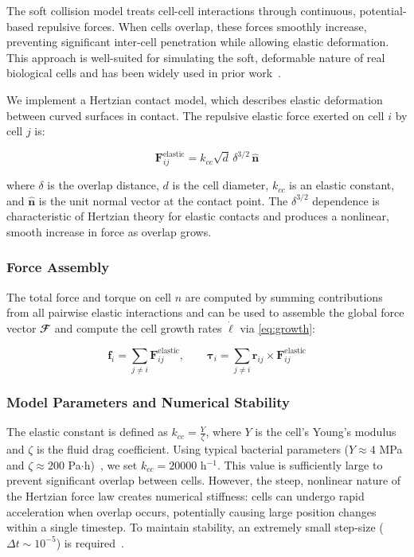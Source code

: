 \documentclass[a4paper,fleqn]{cas-dc}
\begin{document}
The soft collision model treats cell-cell interactions through continuous, potential-based repulsive forces. When cells overlap, these forces smoothly increase, preventing significant inter-cell penetration while allowing elastic deformation. This approach is well-suited for simulating the soft, deformable nature of real biological cells and has been widely used in prior work~\cite{Warren2019, You2018,Blanchard2015,Ghosh2015,Khan_2024,You_2021,Valdez2025,Rudge2013,Langeslay_2023}.

We implement a Hertzian contact model, which describes elastic deformation between curved surfaces in contact. The repulsive elastic force exerted on cell $i$ by cell $j$ is:

\begin{equation} \label{eq:hertzian_contact_model}
    \mathbf{F}^{\text{elastic}}_{ij} = k_{cc} \sqrt{d} \, \delta^{3/2} \, \hat{\mathbf{n}}
\end{equation}

where $\delta$ is the overlap distance, $d$ is the cell diameter, $k_{cc}$ is an elastic constant, and $\hat{\mathbf{n}}$ is the unit normal vector at the contact point. The $\delta^{3/2}$ dependence is characteristic of Hertzian theory for elastic contacts and produces a nonlinear, smooth increase in force as overlap grows.

\subsubsection{Force Assembly}

The total force and torque on cell $n$ are computed by summing contributions from all pairwise elastic interactions and can be used to assemble the global force vector $\mathbfcal{F}$ and compute the cell growth rates $\dot{\boldsymbol{\ell}}$ via \autoref{eq:growth}:

\begin{equation} \label{eq:force_assembly}
    \mathbf{f}_i         = \sum_{j \neq i} \mathbf{F}^{\text{elastic}}_{ij}, \qquad
    \boldsymbol{\tau}_i  = \sum_{j \neq i} \mathbf{r}_{ij} \times \mathbf{F}^{\text{elastic}}_{ij}
\end{equation}

\subsubsection{Model Parameters and Numerical Stability}

The elastic constant is defined as $k_{cc} = \frac{Y}{\zeta}$, where $Y$ is the cell's Young's modulus and $\zeta$ is the fluid drag coefficient. Using typical bacterial parameters ($Y \approx 4$ MPa and $\zeta \approx 200$ Pa$\cdot$h)~\cite{You2018, Blanchard2015}, we set $k_{cc} = 20000$ h$^{-1}$. This value is sufficiently large to prevent significant overlap between cells. However, the steep, nonlinear nature of the Hertzian force law creates numerical stiffness: cells can undergo rapid acceleration when overlap occurs, potentially causing large position changes within a single timestep. To maintain stability, an extremely small step-size ($\Delta t \sim 10^{-5}$) is required~\cite{Khan_2024, You2018, Blanchard2015}.
\end{document}
